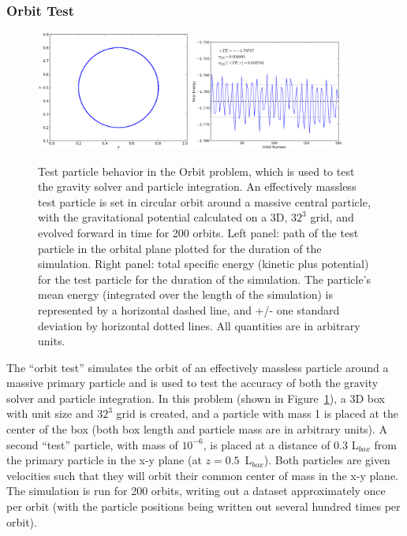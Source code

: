 \subsubsection{Orbit Test}
\label{sec.test.testorbit}

\begin{figure}
\begin{center}
\includegraphics[width=0.45\textwidth]{figures/TestOrbit_xy.eps}
\includegraphics[width=0.45\textwidth]{figures/TestOrbit_TotalEnergy.eps}
\caption{Test particle behavior in the Orbit problem, which is used to
test the gravity solver and particle integration.  An effectively
massless test particle is set in circular orbit around a massive
central particle, with the gravitational potential calculated on a 3D,
$32^3$ grid, and evolved forward in time for 200 orbits.  Left panel:
path of the test particle in the orbital plane plotted for the
duration of the simulation.  Right panel: total specific energy
(kinetic plus potential) for the test particle for the duration of the
simulation.  The particle's mean energy (integrated over the length of
the simulation) is represented by a horizontal dashed line, and +/-
one standard deviation by horizontal dotted lines.  All quantities are
in arbitrary units.}
\label{fig.orbittest}
\end{center}
\end{figure}

The ``orbit test'' simulates the orbit of an effectively massless
particle around a massive primary particle and is used to test the
accuracy of both the gravity solver and particle integration.  In this
problem (shown in Figure~\ref{fig.orbittest}), a 3D box with unit size
and $32^3$ grid is created, and a particle with mass 1 is placed at
the center of the box (both box length and particle mass are in
arbitrary units).  A second ``test'' particle, with mass of $10^{-6}$,
is placed at a distance of 0.3 L$_{box}$ from the primary particle in
the x-y plane (at $z=0.5$~L$_{box}$).  Both particles are given
velocities such that they will orbit their common center of mass in
the x-y plane.  The simulation is run for 200 orbits, writing
out a dataset 
approximately once per orbit (with the particle positions being
written out several hundred times per orbit).


